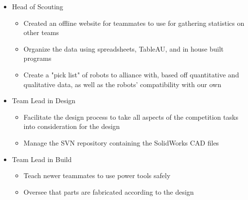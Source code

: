 \documentclass[]{friggeri-cv} %
\begin{document}
\begin{entrylist}
{\begin{itemize}
\begin{itemize}
\begin{itemize}
						\end{itemize}
					\item Run system checks to ensure robot communicates with computer and controllers prior to a match
					\item Create vision systems for the robot drivers
				\end{itemize}
			\item Head of Scouting
				\begin{itemize}
					\item Created an offline website for teammates to use for gathering statistics on other teams
					\item Organize the data using spreadsheets, TableAU, and in house built programs
					\item Create a "pick list" of robots to alliance with, based off quantitative and qualitative data, as well as the robots' compatibility with our own
				\end{itemize}
			\item Team Lead in Design
				\begin{itemize}
					\item Facilitate the design process to take all aspects of the competition tasks into consideration for the design
					\item Manage the SVN repository containing the SolidWorks CAD files
				\end{itemize}
			\item Team Lead in Build
				\begin{itemize}
					\item Teach newer teammates to use power tools safely
					\item Oversee that parts are fabricated according to the design
				\end{itemize}
		\end{itemize}
	}



\end{entrylist}
\end{document}
